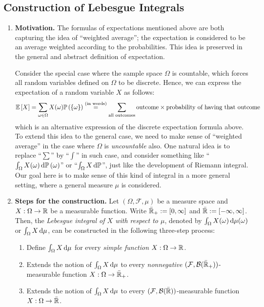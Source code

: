 \subsection{Construction of Lebesgue Integrals}
\label{subsect:construct-lebesgue-int}
\begin{enumerate}
\item \textbf{Motivation.} The formulas of expectations mentioned above are
both capturing the idea of ``weighted average''; the expectation is considered
to be an average weighted according to the probabilities. This idea is
preserved in the general and abstract definition of expectation.

Consider the special case where the sample space \(\Omega\) is countable, which
forces all random variables defined on \(\Omega\) to be discrete. Hence, we can
express the expectation of a random variable \(X\) as follows:
\[
\mathbb{E}\left[X\right]=\sum_{\omega\in\Omega}^{}X(\omega)\mathbb{P}\left(\{\omega\}\right)
\overset{\text{(in words)}}{=}
\sum_{\text{all outcomes}}^{}\text{outcome}\times \text{probability of having that outcome}
\]
which is an alternative expression of the discrete expectation formula above.
To extend this idea to the general case, we need to make sense of ``weighted
average'' in the case where \(\Omega\) is \emph{uncountable} also. One natural
idea is to replace ``\(\sum\)'' by ``\(\int\)'' in such case, and consider
something like ``\(\int_{\Omega}^{}X(\omega)\odif{\prob{\omega}}\)'' or
``\(\int_{\Omega}^{}X\odif{\pr}\)'', just like the development of Riemann
integral.  Our goal here is to make sense of this kind of integral in a more
general setting, where a general measure \(\mu\) is considered.
\item \textbf{Steps for the construction.} Let \((\Omega,\mathcal{F},\mu)\) be
a measure space and \(X:\Omega\to\mathbb{R}\) be a measurable function. Write
\(\bar{\mathbb{R}}_{+}:=[0,\infty]\) and \(\bar{\mathbb{R}}:=[-\infty,\infty]\).  Then, the
\emph{Lebesgue integral of \(X\) with respect to \(\mu\)}, denoted by
\(\int_{\Omega}^{}X(\omega)\odif{\mu(\omega)}\) or
\(\int_{\Omega}^{}X\odif{\mu}\), can be constructed in the following three-step
process:
\begin{enumerate}[label={(\arabic*)}]
\item Define \(\int_{\Omega}^{}X\odif{\mu}\) for every \emph{simple function} \(X:\Omega\to\mathbb{R}\).
\item Extends the notion of \(\int_{\Omega}^{}X\odif{\mu}\) to every
\emph{nonnegative} \((\mathcal{F},\mathcal{B}(\bar{\mathbb{R}}_{+}))\)-measurable function
\(X:\Omega\to\bar{\mathbb{R}}_{+}\).
\item Extends the notion of \(\int_{\Omega}^{}X\odif{\mu}\) to every
\((\mathcal{F},\mathcal{B}(\bar{\mathbb{R}}))\)-measurable function
\(X:\Omega\to\bar{\mathbb{R}}\).


\end{enumerate}
\end{enumerate}
